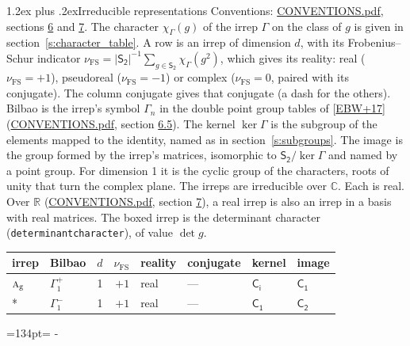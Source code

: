 \documentclass[10pt,a4paper]{article}
\makeatletter
\renewcommand\section{\@startsection{section}{1}{\z@}{-3ex plus -1ex minus -.2ex}%
  {1.2ex plus .2ex}{\normalfont\large\sffamily\bfseries\color{parttitle}}}
\newcommand{\needspace}[1]{\par\penalty-100\begingroup\dimen0=#1\relax\dimen2=\pagegoal
  \advance\dimen2-\pagetotal\ifdim\dimen0>\dimen2\relax\ifdim\dimen2>0pt\vfil\break\fi\fi
  \endgroup}
\numberwithin{equation}{section}
\newcommand{\grp}[1]{\mathsf{#1}}
\newcommand{\irr}[1]{\text{\normalfont\scshape #1}}
\newcommand{\detbox}[1]{{\setlength{\fboxsep}{1pt}\fbox{#1}}}
\newcommand{\ptag}[1]{\mathrm{#1}}
\newcommand{\irchar}[1]{\chi_{#1}}
\newcommand{\fsind}{\nu_{\mathrm{FS}}}
\makeatother
\begin{document}
\section{Irreducible representations}\label{s:irreps}
Conventions: \href{../../CONVENTIONS.pdf}{CONVENTIONS.pdf}, sections \href{../../CONVENTIONS.pdf\#conv.6}{6} and \href{../../CONVENTIONS.pdf\#conv.7}{7}.
\leavevmode\label{n:function.character}\label{n:irrep.Gamma}The character $\irchar{\Gamma}(g)$ of the irrep $\Gamma$ on the class of $g$ is given in section~\ref{s:character_table}.
\leavevmode\label{n:index.dimension}\label{n:index.frobenius}\label{n:head.irrep}\label{n:head.reality}A row is an irrep of dimension $d$, with its Frobenius--Schur indicator $\fsind = |\grp{S_{2}}|^{-1}\allowbreak\sum_{g\in\grp{S_{2}}}\irchar{\Gamma}(g^2)$, which gives its reality: real ($\fsind = +1$), pseudoreal ($\fsind = -1$) or complex ($\fsind = 0$, paired with its conjugate). \label{n:head.conjugate}The column conjugate gives that conjugate (a dash for the others). \label{n:head.bilbao}\label{n:irrep.alias.gamma}Bilbao is the irrep's symbol $\Gamma_n$ in the double point group tables of [\href{../../../REFERENCES.pdf\#ref.EBW+17}{EBW+17}] (\href{../../CONVENTIONS.pdf}{CONVENTIONS.pdf}, section \href{../../CONVENTIONS.pdf\#conv.6.5}{6.5}). \label{n:head.kernel}The kernel $\ker\Gamma$ is the subgroup of the elements mapped to the identity, named as in section~\ref{s:subgroups}. \label{n:head.image}The image is the group formed by the irrep's matrices, isomorphic to $\grp{S_{2}}/\ker\Gamma$ and named by a point group. For dimension 1 it is the cyclic group of the characters, roots of unity that turn the complex plane. The irreps are irreducible over $\mathbb{C}$. Each is real. Over $\mathbb{R}$ (\href{../../CONVENTIONS.pdf}{CONVENTIONS.pdf}, section \href{../../CONVENTIONS.pdf\#conv.7}{7}), a real irrep is also an irrep in a basis with real matrices. \label{n:mark.determinant}The boxed irrep is the determinant character (\texttt{determinantcharacter}), of value $\det g$.
\setlength{\emergencystretch}{2em}\par\setlength{\emergencystretch}{0pt}
{\small\renewcommand{\arraystretch}{1.25}\begin{longtable}{@{}llrrllll@{}}\toprule
irrep & Bilbao & $d$ & $\fsind$ & reality & conjugate & kernel & image\\\midrule\endhead
\bottomrule\endfoot\endlastfoot
$\irr{a}_{\ptag{g}}$ & $\Gamma_{1}^{+}$ & 1 & $+1$ & real & --- & \href{S2.pdf}{$\grp{C_{i}}$} & \href{C1.pdf}{$\grp{C_{1}}$}\\*
\detbox{$\irr{a}_{\ptag{u}}$} & $\Gamma_{1}^{-}$ & 1 & $+1$ & real & --- & \href{C1.pdf}{$\grp{C_{1}}$} & \href{C2.pdf}{$\grp{C_{2}}$}\\
\bottomrule\end{longtable}}
\needspace{134pt}
\end{document}

